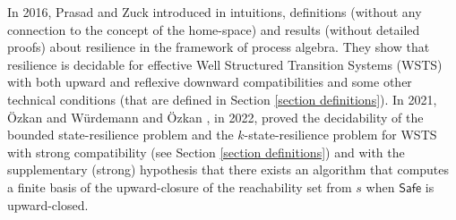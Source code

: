 \documentclass[runningheads]{llncs}
\newcommand{\post}{\textsf{post}}
\newcommand{\Bad}{\textsf{Bad}}
\newcommand{\Safe}{\textsf{Safe}}
\begin{document}
In 2016, Prasad and Zuck introduced in \cite{DBLP:journals/corr/PrasadZ16} intuitions, definitions (without any connection to the concept of the home-space) and results (without detailed proofs) about resilience in the framework of process algebra. They show that resilience is decidable for effective Well Structured Transition Systems (WSTS) with both upward and reflexive downward compatibilities and some other technical conditions (that are defined in Section \ref{section definitions}).
%
%
In 2021, \"Ozkan and Würdemann  \cite{DBLP:journals/corr/abs-2108-00889} and \"Ozkan \cite{DBLP:conf/gg/Ozkan22}, in 2022, proved the decidability of the bounded state-resilience problem and the $k$-state-resilience problem for WSTS  with strong compatibility (see Section \ref{section definitions}) and with the supplementary (strong) hypothesis that there exists an algorithm that computes a finite basis of the upward-closure of the reachability set from $s$ 
%
%
when $\Safe$ is upward-closed.
%
\end{document}
